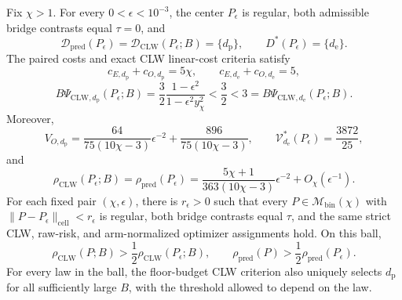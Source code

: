 Fix \(\chi>1\). For every \(0<\epsilon<10^{-3}\), the center \(P_\epsilon\) is regular, both admissible bridge contrasts equal \(\tau=0\), and
\[
 \mathcal D_{\mathrm{pred}}(P_\epsilon)
 =\mathcal D_{\mathrm{CLW}}(P_\epsilon;B)=\{d_{\mathrm p}\},
 \qquad D^*(P_\epsilon)=\{d_{\mathrm e}\}.
\]
The paired costs and exact CLW linear-cost criteria satisfy
\[
 c_{E,d_{\mathrm p}}+c_{O,d_{\mathrm p}}=5\chi,
 \qquad c_{E,d_{\mathrm e}}+c_{O,d_{\mathrm e}}=5,
\]
\[
 B\Psi_{\mathrm{CLW},d_{\mathrm p}}(P_\epsilon;B)
 =\frac32\frac{1-\epsilon^2}{1-\epsilon^2y_\chi^2}
 <\frac32<3
 =B\Psi_{\mathrm{CLW},d_{\mathrm e}}(P_\epsilon;B).
\]
Moreover,
\[
 V_{O,d_{\mathrm p}}
 =\frac{64}{75(10\chi-3)}\epsilon^{-2}
 +\frac{896}{75(10\chi-3)},
 \qquad
 \mathcal V_{d_{\mathrm e}}^*(P_\epsilon)=\frac{3872}{25},
\]
and
\[
 \rho_{\mathrm{CLW}}(P_\epsilon;B)
 =\rho_{\mathrm{pred}}(P_\epsilon)
 =\frac{5\chi+1}{363(10\chi-3)}\epsilon^{-2}+O_\chi(\epsilon^{-1}).
\]
For each fixed pair \((\chi,\epsilon)\), there is \(r_\epsilon>0\) such that every \(P\in\mathcal M_{\mathrm{bin}}(\chi)\) with \(\|P-P_\epsilon\|_{\mathrm{cell}}<r_\epsilon\) is regular, both bridge contrasts equal \(\tau\), and the same strict CLW, raw-risk, and arm-normalized optimizer assignments hold. On this ball,
\[
 \rho_{\mathrm{CLW}}(P;B)>\frac12\rho_{\mathrm{CLW}}(P_\epsilon;B),
 \qquad
 \rho_{\mathrm{pred}}(P)>\frac12\rho_{\mathrm{pred}}(P_\epsilon).
\]
For every law in the ball, the floor-budget CLW criterion also uniquely selects \(d_{\mathrm p}\) for all sufficiently large \(B\), with the threshold allowed to depend on the law.